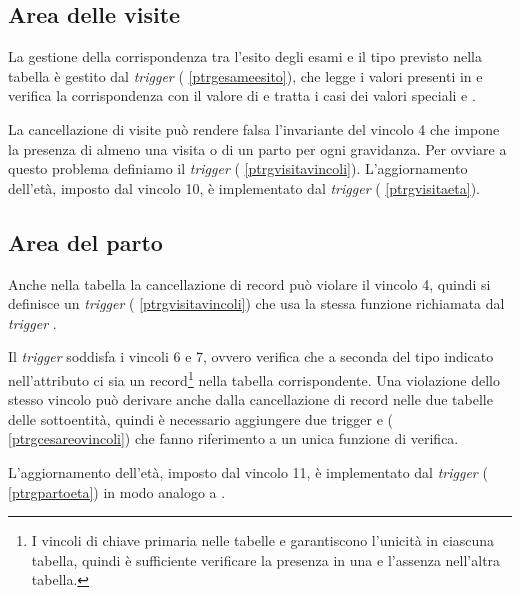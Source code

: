 \subsection{Area delle visite}
\label{triggersvisits}

La gestione della corrispondenza tra l'esito degli esami e il tipo previsto nella tabella  è gestito dal \emph{trigger}  (\lstlistingname{} \ref{ptrgesameesito}), che legge i valori presenti in  e verifica la corrispondenza con il valore  di  e tratta i casi dei valori speciali  e .

La cancellazione di visite può rendere falsa l'invariante del vincolo 4 che impone la presenza di almeno una visita o di un parto per ogni gravidanza.
Per ovviare a questo problema definiamo il \emph{trigger}  (\lstlistingname{} \ref{ptrgvisitavincoli}).
L'aggiornamento dell'età, imposto dal vincolo 10, è implementato dal \emph{trigger}  (\lstlistingname{} \ref{ptrgvisitaeta}).

\subsection{Area del parto}
\label{triggersdelivery}

Anche nella tabella  la cancellazione di record può violare il vincolo 4, quindi si definisce un \emph{trigger}  (\lstlistingname{} \ref{ptrgvisitavincoli}) che usa la stessa funzione richiamata dal \emph{trigger} .

Il \emph{trigger}  soddisfa i vincoli 6 e 7, ovvero verifica che a seconda del tipo indicato nell'attributo  ci sia un record\footnote{
  I vincoli di chiave primaria nelle tabelle  e  garantiscono l'unicità in ciascuna tabella, quindi è sufficiente verificare la presenza in una e l'assenza nell'altra tabella.
} nella tabella corrispondente.
Una violazione dello stesso vincolo può derivare anche dalla cancellazione di record nelle due tabelle delle sottoentità, quindi è necessario aggiungere due trigger  e  (\lstlistingname{} \ref{ptrgcesareovincoli}) che fanno riferimento a un unica funzione di verifica.

L'aggiornamento dell'età, imposto dal vincolo 11, è implementato dal \emph{trigger}  (\lstlistingname{} \ref{ptrgpartoeta}) in modo analogo a .

